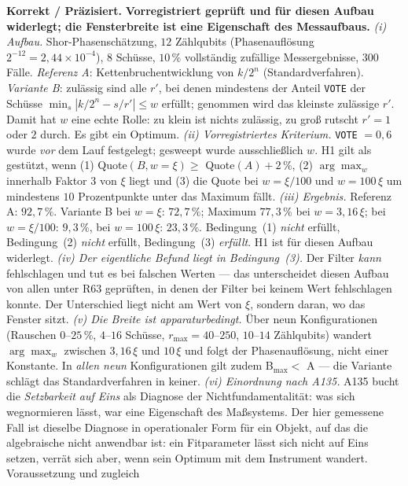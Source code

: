 \smallskip\noindent\textbf{Korrekt / Präzisiert.}\quad
\textbf{Vorregistriert geprüft und für diesen Aufbau widerlegt; die
Fensterbreite ist eine Eigenschaft des Messaufbaus.}
\emph{(i) Aufbau.} Shor-Phasenschätzung, $12$ Zählqubits
(Phasenauflösung $2^{-12} = 2{,}44\times10^{-4}$), $8$ Schüsse,
$10\,\%$ vollständig zufällige Messergebnisse, $300$ Fälle.
\emph{Referenz A}: Kettenbruchentwicklung von $k/2^{n}$ (Standardverfahren).
\emph{Variante B}: zulässig sind alle $r'$, bei denen mindestens der Anteil
\texttt{VOTE} der Schüsse $\min_s |k/2^n - s/r'| \le w$ erfüllt; genommen
wird das kleinste zulässige $r'$. Damit hat $w$ eine echte Rolle: zu klein
ist nichts zulässig, zu groß rutscht $r' = 1$ oder $2$ durch. Es gibt ein
Optimum.
\emph{(ii) Vorregistriertes Kriterium.} \texttt{VOTE} $= 0{,}6$ wurde
\emph{vor} dem Lauf festgelegt; gesweept wurde ausschließlich $w$.
H1 gilt als gestützt, wenn (1) Quote$(B, w=\xi) \ge$ Quote$(A) + 2\,\%$,
(2) $\arg\max_w$ innerhalb Faktor $3$ von $\xi$ liegt und (3) die Quote bei
$w = \xi/100$ und $w = 100\,\xi$ um mindestens $10$ Prozentpunkte unter das
Maximum fällt.
\emph{(iii) Ergebnis.} Referenz A: $92{,}7\,\%$. Variante B bei $w = \xi$:
$72{,}7\,\%$; Maximum $77{,}3\,\%$ bei $w = 3{,}16\,\xi$; bei $w = \xi/100$:
$9{,}3\,\%$, bei $w = 100\,\xi$: $23{,}3\,\%$.
Bedingung~(1) \emph{nicht} erfüllt, Bedingung~(2) \emph{nicht} erfüllt,
Bedingung~(3) \emph{erfüllt}. H1 ist für diesen Aufbau widerlegt.
\emph{(iv) Der eigentliche Befund liegt in Bedingung~(3).} Der Filter
\emph{kann} fehlschlagen und tut es bei falschen Werten --- das
unterscheidet diesen Aufbau von allen unter R63 geprüften, in denen der
Filter bei keinem Wert fehlschlagen konnte. Der Unterschied liegt nicht am
Wert von $\xi$, sondern daran, wo das Fenster sitzt.
\emph{(v) Die Breite ist apparaturbedingt.} Über neun Konfigurationen
(Rauschen $0$--$25\,\%$, $4$--$16$ Schüsse, $r_{\max} = 40$--$250$,
$10$--$14$ Zählqubits) wandert $\arg\max_w$ zwischen $3{,}16\,\xi$ und
$10\,\xi$ und folgt der Phasenauflösung, nicht einer Konstante. In
\emph{allen neun} Konfigurationen gilt zudem B$_{\max} <$ A --- die Variante
schlägt das Standardverfahren in keiner.
\emph{(vi) Einordnung nach A135.} A135 bucht die \emph{Setzbarkeit auf Eins}
als Diagnose der Nichtfundamentalität: was sich wegnormieren lässt, war eine
Eigenschaft des Maßsystems. Der hier gemessene Fall ist dieselbe Diagnose in
operationaler Form für ein Objekt, auf das die algebraische nicht anwendbar
ist: ein Fitparameter lässt sich nicht auf Eins setzen, verrät sich aber,
wenn sein Optimum mit dem Instrument wandert. Voraussetzung und zugleich
